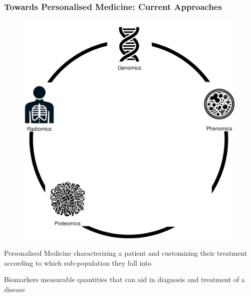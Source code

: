 \documentclass{beamer}
\begin{document}
\begin{frame}
	\frametitle{Towards Personalised Medicine: Current Approaches}
	\begin{minipage}{0.59\textwidth}
		\begin{figure}[H]
			\includegraphics[width=\textwidth]{images/approaches_current.eps}
		\end{figure}
	\end{minipage} 
	\begin{minipage}{0.39\textwidth}
		\begin{minipage}[t][0.41\paperheight][t]{\textwidth}
			\begin{block}{Personalised Medicine}
				characterizing a patient and customizing their treatment according to which sub-population they fall into	
			\end{block}
		\end{minipage}
		\begin{minipage}[t][0.41\paperheight][t]{\textwidth}
			\begin{block}{Biomarkers}
				measurable quantities that can aid in diagnosis and treatment of a disease
			\end{block}
		\end{minipage}
	\end{minipage}
\end{frame}
\end{document}
